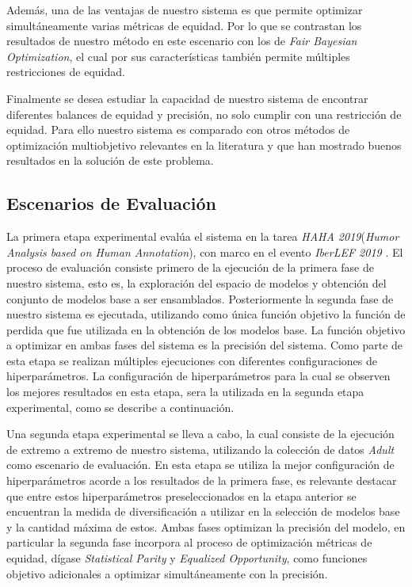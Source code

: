 Además, una de las ventajas de nuestro sistema es que permite optimizar simultáneamente varias métricas de equidad.
Por lo que se contrastan los resultados de nuestro método en este escenario con los de \emph{Fair Bayesian Optimization}, el cual por sus características también permite múltiples restricciones de equidad.

Finalmente se desea estudiar la capacidad de nuestro sistema de encontrar diferentes balances de equidad y precisión, no solo cumplir con una restricción de equidad.
Para ello nuestro sistema es comparado con otros métodos de optimización multiobjetivo relevantes en la literatura y que han mostrado buenos resultados en la solución de este problema.

\subsection{Escenarios de Evaluación}\label{section:evaluation-scenaries}

La primera etapa experimental evalúa el sistema en la tarea \emph{HAHA 2019}(\textit{Humor Analysis based on Human Annotation}), con marco en el evento \textit{IberLEF 2019} \parencite{chiruzzo2019overview}.
El proceso de evaluación consiste primero de la ejecución de la primera fase de nuestro sistema, esto es, la exploración del espacio de modelos y obtención del conjunto de modelos base a ser ensamblados.
Posteriormente la segunda fase de nuestro sistema es ejecutada, utilizando como única función objetivo la función de perdida que fue utilizada en la obtención de los modelos base.
La función objetivo a optimizar en ambas fases del sistema es la precisión del sistema.
Como parte de esta etapa se realizan múltiples ejecuciones con diferentes configuraciones de hiperparámetros.
La configuración de hiperparámetros para la cual se observen los mejores resultados en esta etapa, sera la utilizada en la segunda etapa experimental, como se describe a continuación.

Una segunda etapa experimental se lleva a cabo, la cual consiste de la ejecución de extremo a extremo de nuestro sistema, utilizando la colección de datos \emph{Adult}~\parencite{ucidata} como escenario de evaluación.
En esta etapa se utiliza la mejor configuración de hiperparámetros acorde a los resultados de la primera fase, es relevante destacar que entre estos hiperparámetros preseleccionados en la etapa anterior se encuentran la medida de diversificación a utilizar en la selección de modelos base y la cantidad máxima de estos.
Ambas fases optimizan la precisión del modelo, en particular la segunda fase incorpora al proceso de optimización métricas de equidad, dígase \emph{Statistical Parity} y \emph{Equalized Opportunity}, como funciones objetivo adicionales a optimizar simultáneamente con la precisión.

